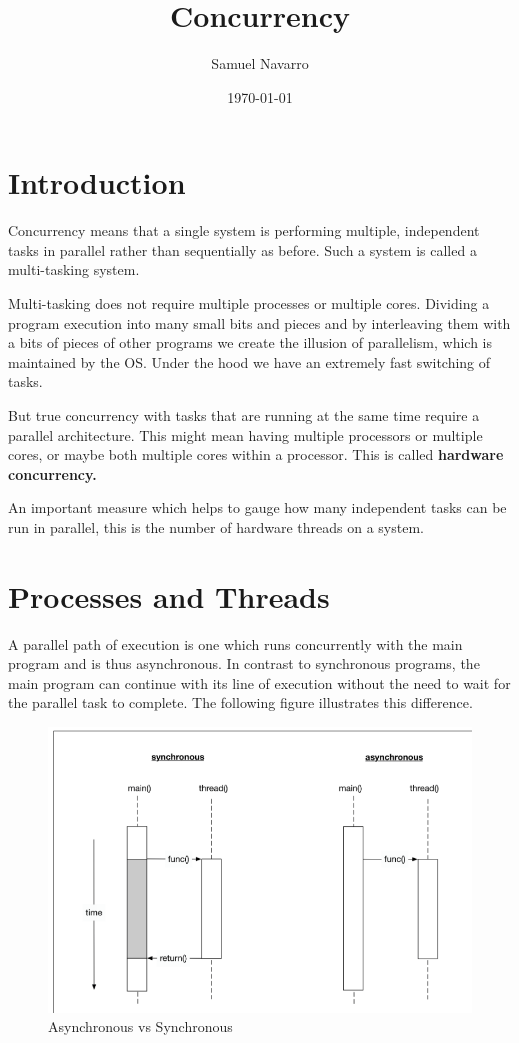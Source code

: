 \documentclass[11pt, a4paper]{article}
\begin{document}
\title{Concurrency}
\author{Samuel Navarro}
\date{\today}
\maketitle
\tableofcontents{}

\section{Introduction}%
\label{sec:introduction}

Concurrency means that a single system is performing multiple, independent tasks in parallel rather than sequentially as before. Such a system is called a multi-tasking system. 

Multi-tasking does not require multiple processes or multiple cores. Dividing a program execution into many small bits and pieces and by interleaving them with a bits of pieces of other programs we create the illusion of parallelism, which is maintained by the OS. Under the hood we have an extremely fast switching of tasks. 

But true concurrency with tasks that are running at the same time require a parallel architecture. This might mean having multiple processors or multiple cores, or maybe both multiple cores within a processor. This is called \textbf{hardware concurrency.}


An important measure which helps to gauge how many independent tasks can be run in parallel, this is the number of hardware threads on a system. 



\section{Processes and Threads}%
\label{sec:processes_and_threads}



A parallel path of execution is one which runs concurrently with the main program and is thus asynchronous. In contrast to synchronous programs, the main program can continue with its line of execution without the need to wait for the parallel task to complete. The following figure illustrates this difference.




\begin{figure}[htpb!]
	\centering
	\includegraphics[width=0.8\linewidth]{async_sync}
	\caption{Asynchronous vs Synchronous}
	\label{fig:async_sync}
\end{figure}
\end{document}
